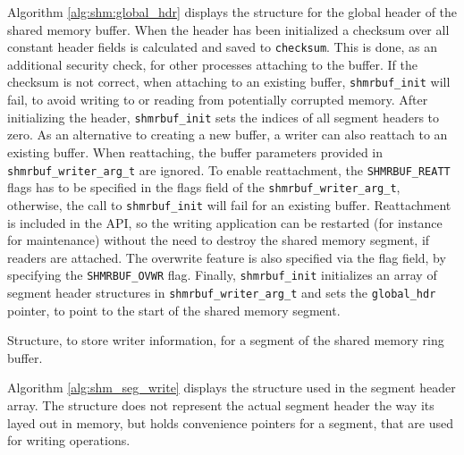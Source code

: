 Algorithm \ref{alg:shm:global_hdr} displays the structure for the global header of the shared memory buffer. When the header has been initialized
a checksum over all constant header fields is calculated and saved to \texttt{checksum}. This is done, as an additional security check, for other processes attaching to the buffer. 
If the checksum is not correct, when attaching to an existing buffer, \texttt{shmrbuf\_init} will fail, to avoid writing to or reading from potentially corrupted memory. After initializing the header,
\texttt{shmrbuf\_init} sets the indices of all segment headers to zero. As an alternative to creating a new buffer,
a writer can also reattach to an existing buffer. When reattaching, the buffer parameters provided in \texttt{shmrbuf\_writer\_arg\_t} are ignored. To enable reattachment, the \texttt{SHMRBUF\_REATT} flags has to be specified in the flags field of the \texttt{shmrbuf\_writer\_arg\_t}, otherwise, the call   
to \texttt{shmrbuf\_init} will fail for an existing buffer. Reattachment is included in the API, so the writing application can be restarted (for instance for maintenance) without the need to
destroy the shared memory segment, if readers are attached. The overwrite feature is also specified via the flag field, by specifying the \texttt{SHMRBUF\_OVWR} flag.
Finally, \texttt{shmrbuf\_init} initializes an array of segment header structures in \texttt{shmrbuf\_writer\_arg\_t} and sets the \texttt{global\_hdr} pointer, to point to the start of the shared memory segment.

\begin{algorithm}[h!]
    
    \caption[Shared Memory Ringbuffer: Writer Segment Header]{Structure, to store writer information, for a segment of the shared memory ring buffer.}
    \label{alg:shm_seg_write}
\end{algorithm}
Algorithm \ref{alg:shm_seg_write} displays the structure  used in the segment header array. The structure does not represent the actual segment header the way its layed out in memory, but holds convenience pointers for a segment, that are used for writing operations.   
   

